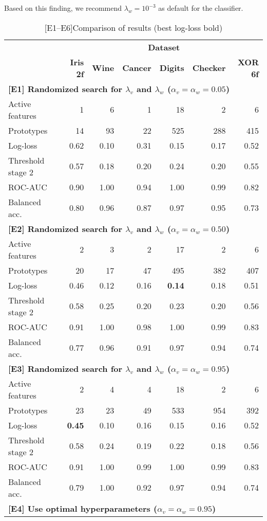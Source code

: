 Based on this finding, we recommend $\lambda_w=10^{-3}$ as default for the classifier.\par
%
\begin{table}
\caption{[E1--E6]Comparison of results (best log-loss bold)}
\label{tab_e1_to_e6}
%
\begin{center}
\small
\begin{tabular}{|lrrrrrr|}
\hline
&\multicolumn{6}{c|}{\textbf{\hrulefill\ Dataset \hrulefill}}\\
&\textbf{Iris 2f}&\textbf{Wine}&\textbf{Cancer}&\textbf{Digits}&\textbf{Checker}&\textbf{XOR 6f}\\
\multicolumn{7}{|l|}{\textbf{[E1] Randomized search for $\lambda_v$ and $\lambda_w$ ($\alpha_v=\alpha_w=0.05$)}}\\
Active features&1&6&1&18&2&6\\
Prototypes&14&93&22&525&288&415\\
Log-loss&0.62&0.10&0.31&0.15&0.17&0.52\\
Threshold stage 2&0.57&0.18&0.20&0.24&0.20&0.55\\
ROC-AUC&0.90&1.00&0.94&1.00&0.99&0.82\\
Balanced acc.&0.80&0.96&0.87&0.97&0.95&0.73\\
\multicolumn{7}{|l|}{\textbf{[E2] Randomized search for $\lambda_v$ and $\lambda_w$ ($\alpha_v=\alpha_w=0.50$)}}\\
Active features&2&3&2&17&2&6\\
Prototypes&20&17&47&495&382&407\\
Log-loss&0.46&0.12&0.16&\textbf{0.14}&0.18&0.51\\
Threshold stage 2&0.58&0.25&0.20&0.23&0.20&0.56\\
ROC-AUC&0.91&1.00&0.98&1.00&0.99&0.83\\
Balanced acc.&0.77&0.96&0.91&0.97&0.94&0.74\\
\multicolumn{7}{|l|}{\textbf{[E3] Randomized search for $\lambda_v$ and $\lambda_w$ ($\alpha_v=\alpha_w=0.95$)}}\\
Active features&2&4&4&18&2&6\\
Prototypes&23&23&49&533&954&392\\
Log-loss&\textbf{0.45}&0.10&0.16&0.15&0.16&0.52\\
Threshold stage 2&0.58&0.24&0.19&0.22&0.18&0.56\\
ROC-AUC&0.91&1.00&0.99&1.00&0.99&0.83\\
Balanced acc.&0.79&1.00&0.92&0.97&0.94&0.74\\
\multicolumn{7}{|l|}{\textbf{[E4] Use optimal hyperparameters ($\alpha_v=\alpha_w=0.95$)}}\\

\end{tabular}
\end{center}
\end{table}
